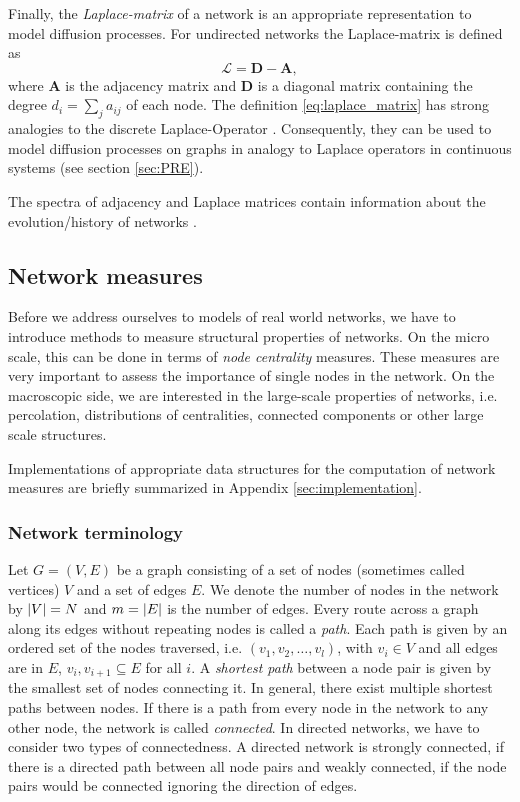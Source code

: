 Finally, the \emph{Laplace-matrix} of a network is an appropriate representation to model diffusion processes.
For undirected networks the Laplace-matrix is defined as
\begin{equation}\label{eq:laplace_matrix}
\mathcal{L}=\mathbf{D}-\mathbf{A},
\end{equation}
where $\mathbf{A}$ is the adjacency matrix and $\mathbf{D}$ is a diagonal matrix containing the degree $d_i=\sum _j a_{ij}$ of each node.
The definition \eqref{eq:laplace_matrix} has strong analogies to the discrete Laplace-Operator \citep{Press:1992}.
Consequently, they can be used to model diffusion processes on graphs in analogy to Laplace operators in continuous systems (see section \ref{sec:PRE}).

The spectra of adjacency and Laplace matrices contain information about the evolution/history of networks \citep{Banerjee2009}.


\subsection{Network measures}\label{sec:network_measures}
Before we address ourselves to models of real world networks, we have to introduce methods to measure structural properties of networks.
On the micro scale, this can be done in terms of \emph{node centrality} measures.
These measures are very important to assess the importance of single nodes in the network.
On the macroscopic side, we are interested in the large-scale properties of networks, i.e. percolation, distributions of centralities, connected components or other large scale structures.

Implementations of appropriate data structures for the computation of network measures are briefly summarized in Appendix \ref{sec:implementation}.

\subsubsection{Network terminology}\label{sec:network_terminology}
Let $G=(V,E)$ be a graph consisting of a set of nodes (sometimes called vertices) $V$ and a set of edges $E$.
We denote the number of nodes in the network by $\left| V \right|=N$ and $m=\left| E \right|$ is the number of edges.
Every route across a graph along its edges without repeating nodes is called a \emph{path}.
Each path is given by an ordered set of the nodes traversed, i.e. $(v_1,v_2,\dots ,v_l)$, with $v_i \in V$ and all edges are in $E$, $v_i,v_{i+1} \subseteq E$ for all $i$.
A \emph{shortest path} between a node pair is given by the smallest set of nodes connecting it.
In general, there exist multiple shortest paths between nodes.
If there is a path from every node in the network to any other node, the network is called \emph{connected}.
In directed networks, we have to consider two types of connectedness.
A directed network is strongly connected, if there is a directed path between all node pairs and weakly connected, if the node pairs would be connected ignoring the direction of edges.

